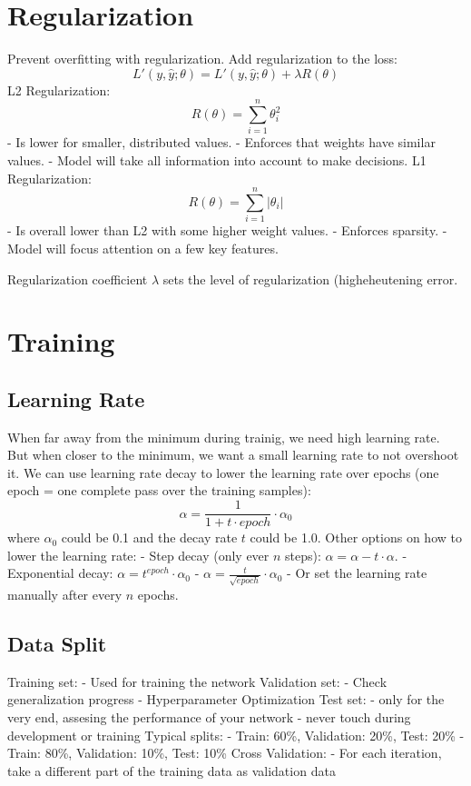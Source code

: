 \documentclass{scrartcl}
\begin{document}
\section*{Regularization}
Prevent overfitting with regularization.
Add regularization to the loss:
$$L'(y, \hat{y}; \theta) = L'(y, \hat{y}; \theta) + \lambda R(\theta)$$
L2 Regularization:
$$R(\theta) = \sum_{i=1}^{n} \theta^2_i$$
- Is lower for smaller, distributed values.
- Enforces that weights have similar values.
- Model will take all information into account to make decisions.
L1 Regularization:
$$R(\theta) = \sum_{i=1}^{n} |\theta_i|$$
- Is overall lower than L2 with some higher weight values.
- Enforces sparsity.
- Model will focus attention on a few key features.

Regularization coefficient $\lambda$ sets the level of regularization (higheheutening error.


\section*{Training}
\subsection*{Learning Rate}
When far away from the minimum during trainig, we need high learning rate. But when closer to the minimum, we want a small learning rate to not overshoot it.
We can use learning rate decay to lower the learning rate over epochs (one epoch = one complete pass over the training samples):
$$\alpha = \frac{1}{1 + t \cdot epoch} \cdot \alpha_0$$
where $\alpha_0$ could be 0.1 and the decay rate $t$ could be 1.0.
Other options on how to lower the learning rate:
- Step decay (only ever $n$ steps): $\alpha = \alpha - t \cdot \alpha$.
- Exponential decay: $\alpha = t^{epoch} \cdot \alpha_0$
- $\alpha = \frac{t}{\sqrt{epoch}} \cdot \alpha_0$
- Or set the learning rate manually after every $n$ epochs.

\subsection*{Data Split}
Training set:
- Used for training the network
Validation set:
- Check generalization progress
- Hyperparameter Optimization
Test set:
- only for the very end, assesing the performance of your network
- never touch during development or training
Typical splits:
- Train: 60\%, Validation: 20\%, Test: 20\%
- Train: 80\%, Validation: 10\%, Test: 10\%
Cross Validation:
- For each iteration, take a different part of the training data as validation data
\end{document}

